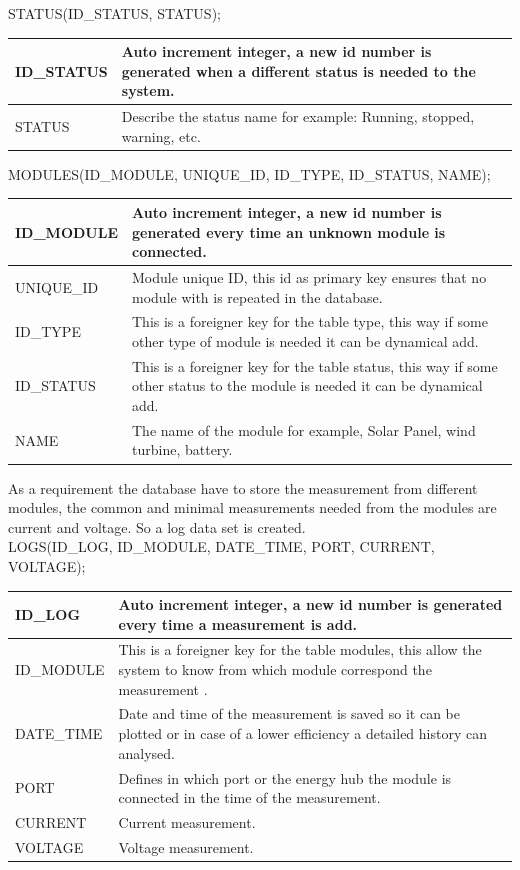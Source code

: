 STATUS(ID\_STATUS, STATUS);

\begin{table}[H]
\centering
	\begin{tabular}{| p{2cm} | p{10cm} |}
		\hline
		ID\_STATUS & Auto increment integer, a new id number is generated when a different status is needed to the system. \\\hline
		STATUS & Describe the status name for example: Running, stopped, warning, etc.\\\hline
	\end{tabular}
\end{table}


MODULES(ID\_MODULE, UNIQUE\_ID, ID\_TYPE, ID\_STATUS, NAME);

\begin{table}[H]
\centering
	\begin{tabular}{| p{2cm} | p{10cm} |}
		\hline
		ID\_MODULE & Auto increment integer, a new id number is generated every time an unknown module is connected. \\\hline
		UNIQUE\_ID & Module unique ID, this id as primary key ensures that no module with is repeated in the database.\\\hline
		ID\_TYPE & This is a foreigner key for the table type, this way if some other type of module is needed it can be dynamical add. \\\hline
		ID\_STATUS & This is a foreigner key for the table status, this way if some other status to the module is needed it can be dynamical add. \\\hline
		NAME & The name of the module for example, Solar Panel, wind turbine, battery. \\\hline
	\end{tabular}
\end{table}
As a requirement the database have to store the measurement  from different modules, the common and minimal measurements needed from the modules are current and voltage. So a log data set is created.\\

LOGS(ID\_LOG, ID\_MODULE, DATE\_TIME, PORT, CURRENT, VOLTAGE);

\begin{table}[H]
\centering
	\begin{tabular}{| p{2cm} | p{10cm} |}
		\hline
		ID\_LOG & Auto increment integer, a new id number is generated every time a measurement is add. \\\hline
		ID\_MODULE & This is a foreigner key for the table modules, this allow the system to know from which module correspond the measurement .\\\hline
		DATE\_TIME & Date and time of the measurement is saved so it can be plotted or in case of a lower efficiency a detailed history can analysed. \\\hline
		PORT & Defines in which port or the energy hub the module is connected in the time of the measurement. \\\hline
		CURRENT & Current measurement. \\\hline
		VOLTAGE & Voltage measurement. \\\hline
	\end{tabular}
\end{table}

